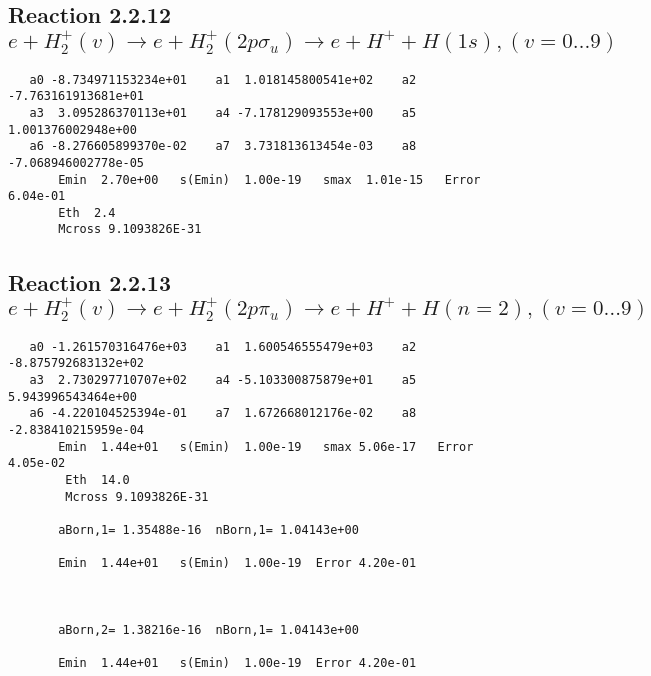 \documentclass[12pt,dvipdfmx]{article}
\begin{document}
\newpage
\subsection{
Reaction 2.2.12 $e + H_2^+(v) \rightarrow e + H_2^+(2p\sigma_u) \rightarrow e + H^+ + H(1s), (v=0\ldots 9)$}














\begin{small}\begin{verbatim}
   a0 -8.734971153234e+01    a1  1.018145800541e+02    a2 -7.763161913681e+01
   a3  3.095286370113e+01    a4 -7.178129093553e+00    a5  1.001376002948e+00
   a6 -8.276605899370e-02    a7  3.731813613454e-03    a8 -7.068946002778e-05
       Emin  2.70e+00   s(Emin)  1.00e-19   smax  1.01e-15   Error  6.04e-01
       Eth  2.4
       Mcross 9.1093826E-31
\end{verbatim}\end{small}




\newpage
\subsection{
Reaction 2.2.13 $ e + H_2^+(v) \rightarrow e + H_2^+(2p\pi_u) \rightarrow e + H^+ + H(n=2),  (v=0\ldots 9)$}



\begin{small}\begin{verbatim}
   a0 -1.261570316476e+03    a1  1.600546555479e+03    a2 -8.875792683132e+02
   a3  2.730297710707e+02    a4 -5.103300875879e+01    a5  5.943996543464e+00
   a6 -4.220104525394e-01    a7  1.672668012176e-02    a8 -2.838410215959e-04
       Emin  1.44e+01   s(Emin)  1.00e-19   smax 5.06e-17   Error 4.05e-02
        Eth  14.0
        Mcross 9.1093826E-31

       aBorn,1= 1.35488e-16  nBorn,1= 1.04143e+00

       Emin  1.44e+01   s(Emin)  1.00e-19  Error 4.20e-01



       aBorn,2= 1.38216e-16  nBorn,1= 1.04143e+00

       Emin  1.44e+01   s(Emin)  1.00e-19  Error 4.20e-01

\end{verbatim}\end{small}
\end{document}
